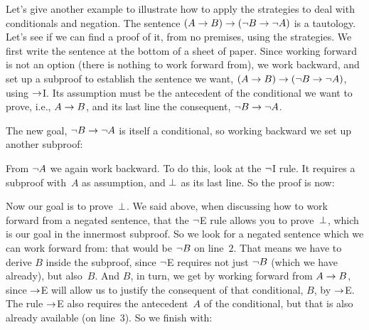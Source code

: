 Let's give another example to illustrate how to apply the strategies to deal with conditionals and negation. The sentence $(A \rightarrow B) \rightarrow (\neg B \rightarrow \neg A)$ is a tautology. Let's see if we can find a proof of it, from no premises, using the strategies. We first write the sentence at the bottom of a sheet of paper. Since working forward is not an option (there is nothing to work forward from), we work backward, and set up a subproof to establish the sentence we want, $(A \rightarrow B) \rightarrow (\neg B \rightarrow \neg A)$, using $\rightarrow$I. Its assumption must be the antecedent of the conditional we want to prove, i.e., $A \rightarrow B$, and its last line the consequent, $\neg B \rightarrow \neg A$.
\begin{fitchproof}
\open
{}
\ellipsesline
{}
\close
{}
\end{fitchproof}
The new goal, $\neg B \rightarrow \neg A$ is itself a conditional, so working backward we set up another subproof:
\begin{fitchproof}
	\open
	\open
	\ellipsesline
	\close
	\close
\end{fitchproof}
From $\neg A$ we again work backward. To do this, look at the $\neg$I rule. It requires a subproof with~$A$ as assumption, and $\bot$ as its last line. So the proof is now:
\begin{fitchproof}
	\open
	\open
	\open{}
	\ellipsesline
	\close
	\close
	\close
\end{fitchproof}
Now our goal is to prove~$\bot$. We said above, when discussing how
to work forward from a negated sentence, that the $\neg$E rule allows
you to prove~$\bot$, which is our goal in the innermost subproof. So
we look for a negated sentence which we can work forward from: that
would be $\neg B$ on line~$2$. That means we have to derive $B$
inside the subproof, since $\neg$E requires not just $\neg B$ (which
we have already), but also~$B$. And $B$, in turn, we get by working
forward from $A \rightarrow B$, since $\rightarrow$E will allow us to justify the
consequent of that conditional, $B$, by $\rightarrow$E. The rule $\rightarrow$E also
requires the antecedent~$A$ of the conditional, but that is also
already available (on line~$3$). So we finish with:
\begin{fitchproof}
	\open
	\open
	\open{}
	\close
	\close
	\close
\end{fitchproof}

